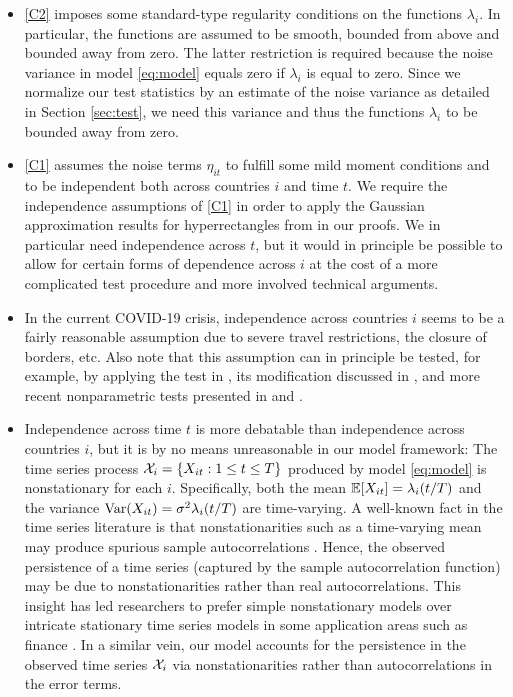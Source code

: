 \documentclass[a4paper,12pt]{article}
\numberwithin{equation}{section}
\begin{document}
{\color{red}
\begin{itemize}[leftmargin=1.0cm]
\item \ref{C2} imposes some standard-type regularity conditions on the functions $\lambda_i$. In particular, the functions are assumed to be smooth, bounded from above and bounded away from zero. The latter restriction is required because the noise variance in model \eqref{eq:model} equals zero if $\lambda_i$ is equal to zero. Since we normalize our test statistics by an estimate of the noise variance as detailed in Section \ref{sec:test}, we need this variance and thus the functions $\lambda_i$ to be bounded away from zero. 

\item \ref{C1} assumes the noise terms $\eta_{it}$ to fulfill some mild moment conditions and to be independent both across countries $i$ and time $t$. We require the independence assumptions of \ref{C1} in order to apply the Gaussian approximation results for hyperrectangles from \cite{Chernozhukov2017} in our proofs. We in particular need independence across $t$, but it would in principle be possible to allow for certain forms of dependence across $i$ at the cost of a more complicated test procedure and more involved technical arguments. 

\item In the current COVID-19 crisis, independence across countries $i$ seems to be a fairly reasonable assumption due to severe travel restrictions, the closure of borders, etc. Also note that this assumption can in principle be tested, for example, by applying the test in \cite{Ahmad1997}, its modification discussed in \cite{Li2007}, and more recent nonparametric tests presented in \cite{Bakirov2006} and \cite{Matilla2010}. 

\item Independence across time $t$ is more debatable than independence across countries $i$, but it is by no means unreasonable in our model framework: The time series process $\mathcal{X}_i = \{X_{it}: 1 \le t \le T\}$ produced by model \eqref{eq:model} is nonstationary for each $i$. Specifically, both the mean $\mathbb{E}[X_{it}] = \lambda_i(t/T)$ and the variance $\textnormal{Var}(X_{it}) = \sigma^2 \lambda_i(t/T)$ are time-varying. A well-known fact in the time series literature is that nonstationarities such as a time-varying mean may produce spurious sample autocorrelations {\color{red}\citep[see e.g.][]{MikoschStarica2004, Fryzlewicz2008}}. Hence, the observed persistence of a time series (captured by the sample autocorrelation function) may be due to nonstationarities rather than real autocorrelations. This insight has led researchers to prefer simple nonstationary models over intricate stationary time series models in some application areas such as finance {\color{red}\citep[see e.g.][]{MikoschStarica2000, MikoschStarica2004, Fryzlewicz2006, HafnerLinton2010}}. In a similar vein, our model accounts for the persistence in the observed time series $\mathcal{X}_i$ via nonstationarities rather than autocorrelations in the error terms.
\end{itemize}}
\end{document}
